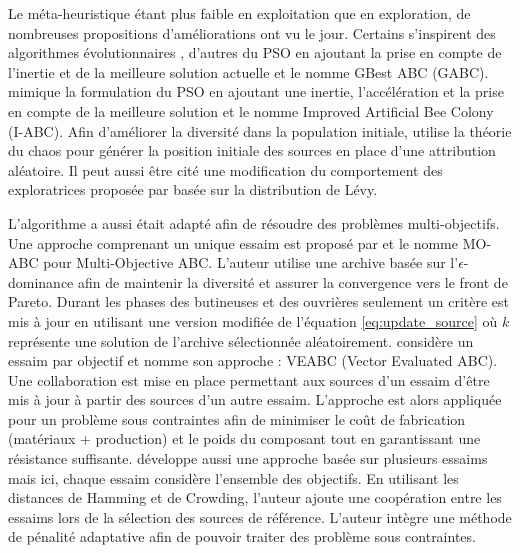 Le méta-heuristique étant plus faible en exploitation que en exploration, de nombreuses
propositions d’améliorations ont vu le jour.
Certains s’inspirent des algorithmes évolutionnaires \parencite{Bi2011174,Zhao2010558},
d’autres du PSO \parencite{Zhu20103166} en ajoutant la prise en compte de l’inertie
et de la meilleure solution actuelle et le nomme GBest ABC (GABC). \cite{Li2012320}
mimique la formulation du PSO en ajoutant une inertie, l’accélération et la prise
en compte de la meilleure solution et le nomme Improved Artificial Bee Colony (I-ABC).
Afin d’améliorer la diversité dans la population initiale, \cite{Xiang20131256}
utilise la théorie du chaos pour générer la position initiale des sources en place
d’une attribution aléatoire. Il peut aussi être cité une modification du comportement
des exploratrices proposée par \cite{Sharma2012213} basée sur la distribution de
Lévy.

L’algorithme a aussi était adapté afin de résoudre des problèmes multi-objectifs.
Une approche comprenant un unique essaim est proposé par \cite{Akbari201239}
et le nomme MO-ABC pour Multi-Objective ABC.
L’auteur utilise une archive basée sur l’$\epsilon$-dominance afin de maintenir
la diversité et assurer la convergence vers le front de Pareto. Durant les phases
des butineuses et des ouvrières seulement un critère est mis à jour en utilisant
une version modifiée de l’équation \eqref{eq:update_source} où $k$ représente une
solution de l’archive sélectionnée aléatoirement.
\cite{Omkar2011489} considère un essaim par objectif et nomme son approche : VEABC  (Vector Evaluated ABC).
Une collaboration est mise en place permettant aux sources d’un essaim d’être mis
à jour à partir des sources d’un autre essaim. L’approche est alors appliquée pour un
problème sous contraintes afin de minimiser le coût de fabrication (matériaux + production)
et le poids du composant tout en garantissant une résistance suffisante.
\cite{Zhang20121} développe aussi une approche basée sur plusieurs essaims mais ici,
chaque essaim considère l’ensemble des objectifs. En utilisant les distances de Hamming
et de Crowding, l’auteur ajoute une coopération entre les essaims lors de la sélection
des sources de référence. L’auteur intègre une méthode de pénalité adaptative \parencite{Woldesenbet20073077}
afin de pouvoir traiter des problème sous contraintes.


